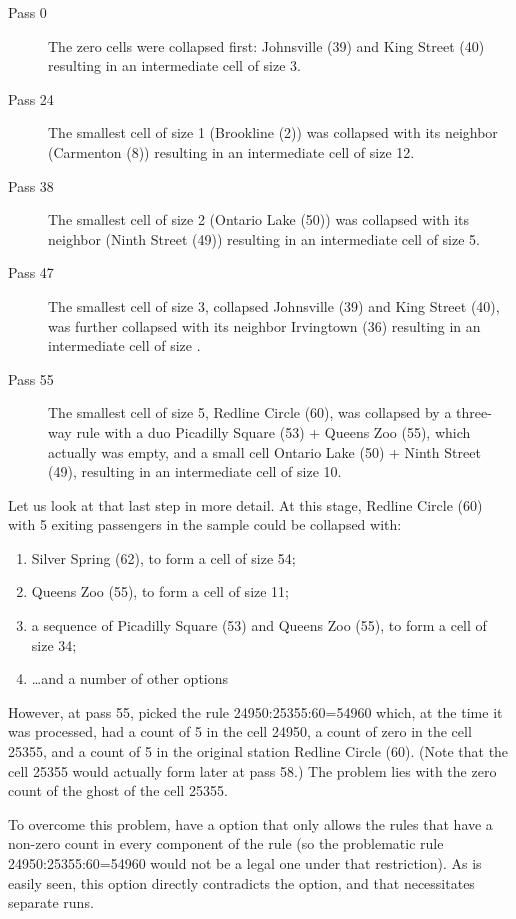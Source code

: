 \begin{description}
    \item[Pass 0] The zero cells were collapsed first: Johnsville (39) and King Street (40) resulting
        in an intermediate cell of size 3.
    \item[Pass 24] The smallest cell of size 1 (Brookline (2)) was collapsed with its neighbor
        (Carmenton (8)) resulting in an intermediate cell of size 12.
    \item[Pass 38] The smallest cell of size 2 (Ontario Lake (50)) was collapsed with its neighbor
        (Ninth Street (49)) resulting in an intermediate cell of size 5.
    \item[Pass 47] The smallest cell of size 3, collapsed Johnsville (39) and King Street (40),
        was further collapsed with its neighbor Irvingtown (36) resulting in an intermediate cell of size .
    \item[Pass 55] The smallest cell of size 5, Redline Circle (60), was collapsed by a three-way rule
        with a duo Picadilly Square (53) + Queens Zoo (55), which actually was empty, and a small cell
        Ontario Lake (50) + Ninth Street (49), resulting in an intermediate cell of size 10.
\end{description}

Let us look at that last step in more detail. At this stage, Redline Circle (60) with 5 exiting passengers in
the sample could be collapsed with:
\begin{enumerate}
    \item Silver Spring (62), to form a cell of size 54;
    \item Queens Zoo (55), to form a cell of size 11;
    \item a sequence of Picadilly Square (53) and Queens Zoo (55), to form a cell of size 34;
    \item \ldots and a number of other options
\end{enumerate}
However, at pass 55,  picked the rule 24950:25355:60=54960 which, at the time it was
processed, had a count of 5 in the cell 24950, a count of zero in the cell 25355, and a count of 5 in the
original station Redline Circle (60). (Note that the cell 25355 would actually form later at pass 58.)
The problem lies with the zero count of the ghost of the cell 25355.

To overcome this problem,  have a  option that only allows the rules
that have a non-zero count in every component of the rule (so the problematic rule
24950:25355:60=54960 would not be a legal one under that restriction). As is easily seen,
this option directly contradicts the  option, and that necessitates separate runs.

